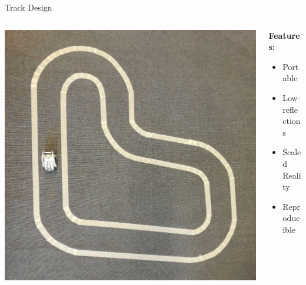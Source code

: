 \documentclass[aspectratio=169]{beamer}
\begin{document}
\begin{frame}{Track Design}
	\centering
	\begin{columns}
		\begin{column}{0.5\linewidth}
			\begin{center}
					\includegraphics[height=0.6\textheight]{img/track.png}
			\end{center}
		\end{column}
		\begin{column}{0.5\linewidth}
			\textbf<1->{Features:}
			\begin{itemize}[<+- | alert@+>]
				\item{Portable}
				\item{Low-reflections}
				\item{Scaled Reality}
				\item{Reproducible}
			\end{itemize}
		\end{column}
	\end{columns}
\end{frame}
\end{document}
